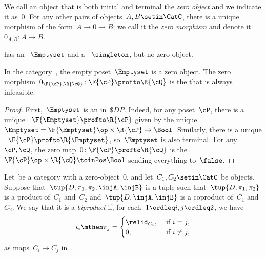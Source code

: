 \begin{ctdefinition}
    \label{def:zero-object}
    We call an object that is both initial and terminal the \emph{zero object} and we indicate it as~$0$.
    For any other pairs of objects~$A, B\setin\CatC$, there is a unique morphism of the form~$A \to 0\to B$; we call it the \emph{zero morphism} and denote it~$0_{A,B}\colon A \to B$.
\end{ctdefinition}

\begin{example}
    \Pos has an ~$\Emptyset$ and a ~$\singleton$, but no zero object.
\end{example}

\begin{lemma}
    In the category~\DP, the empty poset~$\Emptyset$ is a zero object.
    The zero morphism~$0_{\F{\cP},\R{\cQ}}\colon \F{\cP} \profto \R{\cQ}$ is the  that is always infeasible.
\end{lemma}
\begin{proof}
    First,~$\Emptyset$ is an  in~$\$DP$.
        Indeed, for any poset~$\cP $, there is a unique ~$\F{\Emptyset} \profto \R{\cP}$ given by the unique ~$\Emptyset=\F{\Emptyset}\op\times \R{\cP} \to\Bool$.
        Similarly, there is a unique ~$\F{\cP} \profto \R{\Emptyset}$, so~$\Emptyset$ is also terminal.
        For any ~$\cP,\cQ$, the zero map~$0 \colon \F{\cP} \profto \R{\cQ}$ is the ~$\F{\cP} \op\times \R{\cQ} \toinPos \Bool$ sending everything to~$\false$.
\end{proof}

\begin{ctdefinition}[Biproduct]
    \label{def:biproduct}
    Let~\CatC be a category with a zero-object~$0$, and let~$C_1,C_2\setin\CatC$ be objects.
    Suppose that~$\tup{D,\pi_1,\pi_2,\injA,\injB}$ is a tuple such that~$\tup{D,\pi_1,\pi_2}$ is a product of~$C_1$ and~$C_2$ and~$\tup{D,\injA,\injB}$ is a coproduct of~$C_1$ and~$C_2$.
    We say that it is a \emph{biproduct} if, for each~$1\ordleq i,j\ordleq 2$, we have
    \begin{equation}
        \iota_i\mthen \pi_j=
        \begin{cases}
            \relid_{C_i}, & \text{ if }i=j,     \\
            0,            & \text{ if }i\neq j,
        \end{cases} \label{eq:biproduct-condition}
    \end{equation}
    as maps~$C_i\to C_j$ in~\CatC.
\end{ctdefinition}

